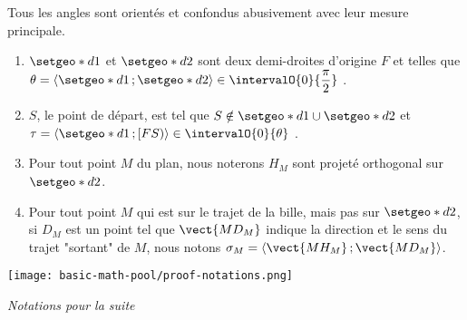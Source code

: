 Tous les angles sont orientés et confondus abusivement avec leur mesure principale.
\begin{enumerate}
	\item $\setgeo*{d}{1}$ et $\setgeo*{d}{2}$ sont deux demi-droites d'origine $F$ et telles que $\theta = \langle \setgeo*{d}{1} \,; \setgeo*{d}{2} \rangle \in \intervalO{0}{\dfrac{\pi}{2}}$ .

	\item $S$, le point de départ, est tel que $S \notin \setgeo*{d}{1} \cup \setgeo*{d}{2}$ et $\tau = \langle \setgeo*{d}{1} \,; [FS) \rangle \in \intervalO{0}{\theta}$ .
	
	\item Pour tout point $M$ du plan, nous noterons $H_M$ sont projeté orthogonal sur $\setgeo*{d}{2}$.
	
	\item Pour tout point $M$ qui est sur le trajet de la bille, mais pas sur $\setgeo*{d}{2}$, si $D_M$ est un point tel que $\vect{MD_M}$ indique la direction et le sens du trajet "sortant" de $M$, nous notons $\sigma_M = \langle \vect{MH_M} \,; \vect{MD_M} \rangle$.
\end{enumerate}


\medskip


\begin{center}
	\texttt{[image: basic-math-pool/proof-notations.png]}
	
	\itshape\small
	Notations pour la suite
\end{center}


